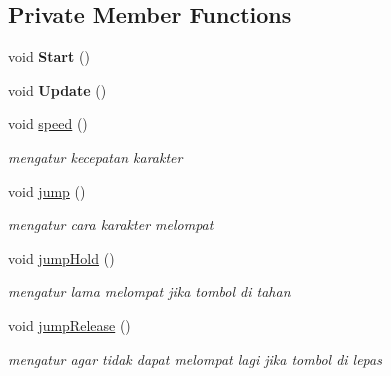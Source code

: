 \subsection*{Private Member Functions}
\begin{DoxyCompactItemize}
\item 
\hypertarget{class_player_controller_ae1117d9c4da3193181cddad2c814e467}{}\label{class_player_controller_ae1117d9c4da3193181cddad2c814e467} 
void {\bfseries Start} ()
\item 
\hypertarget{class_player_controller_ae8bc83dffb99867a04be016473ed2c43}{}\label{class_player_controller_ae8bc83dffb99867a04be016473ed2c43} 
void {\bfseries Update} ()
\item 
void \hyperlink{class_player_controller_accbeb6b75b9f6067679b960a91581de6}{speed} ()
\begin{DoxyCompactList}\small\item\em mengatur kecepatan karakter \end{DoxyCompactList}\item 
void \hyperlink{class_player_controller_a413e8e34033169093b21b38bf6bd0b34}{jump} ()
\begin{DoxyCompactList}\small\item\em mengatur cara karakter melompat \end{DoxyCompactList}\item 
void \hyperlink{class_player_controller_afd5b28f0a9018e11fc879c93107c7a37}{jump\+Hold} ()
\begin{DoxyCompactList}\small\item\em mengatur lama melompat jika tombol di tahan \end{DoxyCompactList}\item 
void \hyperlink{class_player_controller_af65ea7266683911055939bfad8c4248b}{jump\+Release} ()
\begin{DoxyCompactList}\small\item\em mengatur agar tidak dapat melompat lagi jika tombol di lepas \end{DoxyCompactList}\end{DoxyCompactItemize}
